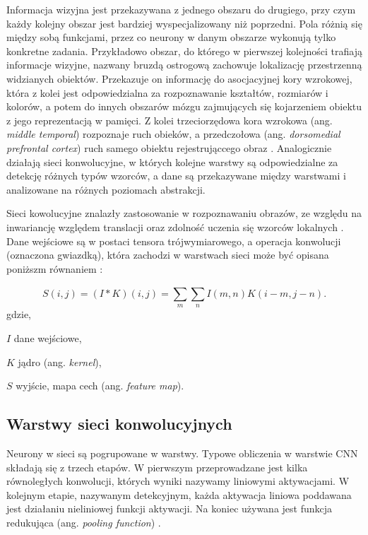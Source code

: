 Informacja wizyjna jest przekazywana z jednego obszaru do drugiego, przy czym każdy kolejny obszar jest bardziej wyspecjalizowany niż poprzedni. Pola różnią się między sobą funkcjami, przez co neurony w danym obszarze wykonują tylko konkretne zadania. Przykładowo obszar, do którego w pierwszej kolejności trafiają informacje wizyjne, nazwany bruzdą ostrogową zachowuje lokalizację przestrzenną widzianych obiektów. Przekazuje on informację do asocjacyjnej kory wzrokowej, która z kolei jest odpowiedzialna za rozpoznawanie kształtów, rozmiarów i kolorów, a potem do innych obszarów mózgu zajmujących się kojarzeniem obiektu z jego reprezentacją w pamięci. Z kolei trzeciorzędowa kora wzrokowa (ang. \textit{middle temporal}) rozpoznaje ruch obieków, a przedczołowa (ang. \textit{dorsomedial prefrontal cortex}) ruch samego obiektu rejestrująccego obraz \cite{cnn_website}. Analogicznie działają sieci konwolucyjne, w których kolejne warstwy są odpowiedzialne za detekcję różnych typów wzorców, a dane są przekazywane między warstwami i analizowane na różnych poziomach abstrakcji.

Sieci kowolucyjne znalazły zastosowanie w rozpoznawaniu obrazów, ze względu na inwariancję względem translacji oraz zdolność uczenia się wzorców lokalnych \cite{Chollet2017DeepLW}. Dane wejściowe są w postaci tensora trójwymiarowego, a operacja konwolucji (oznaczona gwiazdką), która zachodzi w warstwach sieci może być opisana poniższm równaniem \cite{deep_learning}:

\begin{equation}
S(i,j) = (I * K)(i,j) = \sum_{m}^{}\sum_{n}^{} I(m,n)K(i-m,j-n).
\end{equation}
gdzie,
\begin{eqwhere}[2cm]
	\item[$I$] dane wejściowe,
	\item[$K$] jądro (ang. \textit{kernel}),
	\item[$S$] wyjście, mapa cech (ang. \textit{feature map}).
\end{eqwhere}


\subsection{Warstwy sieci konwolucyjnych}

Neurony w sieci są pogrupowane w warstwy. Typowe obliczenia w warstwie CNN składają się z trzech etapów. W pierwszym przeprowadzane jest kilka równoległych konwolucji, których wyniki nazywamy liniowymi aktywacjami. W kolejnym etapie, nazywanym detekcyjnym, każda aktywacja liniowa poddawana jest działaniu nieliniowej funkcji aktywacji. Na koniec używana jest funkcja redukująca (ang. \textit{pooling function}) \cite{deep_learning}.

